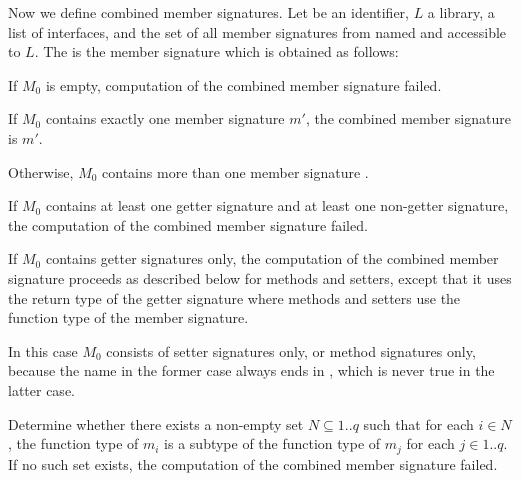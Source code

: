 \documentclass[makeidx]{article}
\begin{document}
\LMHash{}%
%
Now we define combined member signatures.
Let \id{} be an identifier, $L$ a library,
 a list of interfaces,
and  the set of
all member signatures from  named \id{}
and accessible to $L$.
The
is the member signature which is obtained as follows:

\LMHash{}%
If $M_0$ is empty, computation of the combined member signature failed.

\LMHash{}%
If $M_0$ contains exactly one member signature $m'$,
the combined member signature is $m'$.

\LMHash{}%
Otherwise, $M_0$ contains more than one member signature
.

\LMHash{}%
If $M_0$ contains at least one getter signature
and at least one non-getter signature,
the computation of the combined member signature failed.
\EndCase

\LMHash{}%
If $M_0$ contains getter signatures only,
the computation of the combined member signature proceeds as described below
for methods and setters,
except that it uses the return type of the getter signature
where methods and setters use the function type of the member signature.
\EndCase

\LMHash{}%
In this case $M_0$ consists of setter signatures only,
or method signatures only,
because the name \id{} in the former case always ends in \lit{=},
which is never true in the latter case.

\LMHash{}%
%
Determine whether there exists a non-empty set $N \subseteq 1 .. q$ such that
for each $i \in N$,
the function type of $m_i$ is a subtype of
the function type of $m_j$ for each $j \in 1 .. q$.
%
If no such set exists, the computation of the combined member signature failed.
\end{document}
